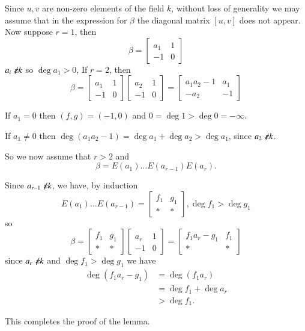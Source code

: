 \begin{Proof}
Since $u,v$ are non-zero elements of the field $k$, without loss of
generality we may assume that in the expression for $\beta$ the
diagonal matrix $[u,v]$ does not appear. Now suppose $r=1$, then 
$$
\beta=
\begin{bmatrix}
a_1 & 1\\
-1 & 0
\end{bmatrix}
$$
$a_i\not\kern-2pt\varepsilon k$ so $\deg a_1>0$, If $r=2$, then
$$
\beta=
\begin{bmatrix}
a_1 & 1\\
-1 & 0
\end{bmatrix} \begin{bmatrix}
a_2 & 1\\
-1 & 0
\end{bmatrix} =\begin{bmatrix}
a_1a_{2}-1 & a_1\\
-a_2 & -1
\end{bmatrix}
$$

If $a_1=0$ then $(f,g)=(-1,0)$ and $0=\deg 1> \deg0=-\infty$.

If $a_1\neq 0$ then $\deg (a_1a_2-1)=\deg a_1+\deg a_2>\deg a_1$,
since $a_2\not\kern-2pt\varepsilon k$. 

So we now assume that $r>2$ and 
$$
\beta= E(a_1)\ldots E(a_{r-1})E(a_r).
$$

Since $a_{r-1}\not\kern-2pt\varepsilon k$, we have, by induction
$$
E(a_1)\ldots E(a_{r-1})=
\begin{bmatrix}
f_1 & g_1\\
\ast & \ast
\end{bmatrix}, \deg f_1 > \deg  g_1
$$
so
$$
\beta=
\begin{bmatrix}
f_1 & g_1\\
\ast & \ast
\end{bmatrix} \begin{bmatrix}
a_r & 1\\
-1 & 0
\end{bmatrix} = \begin{bmatrix}
f_1a_r-g_1 & f_1\\
\ast & \ast
\end{bmatrix}
$$
since $a_r \not\kern-2pt\varepsilon k$ and $\deg f_1> \deg g_1$ we have 
\begin{align*}
\deg(f_1a_r-g_1)&=\deg(f_1a_r)\\
&=\deg f_1+\deg a_r\\
&>\deg f_1.
\end{align*}

This completes the proof of the lemma.
\enprf
\end{Proof}

